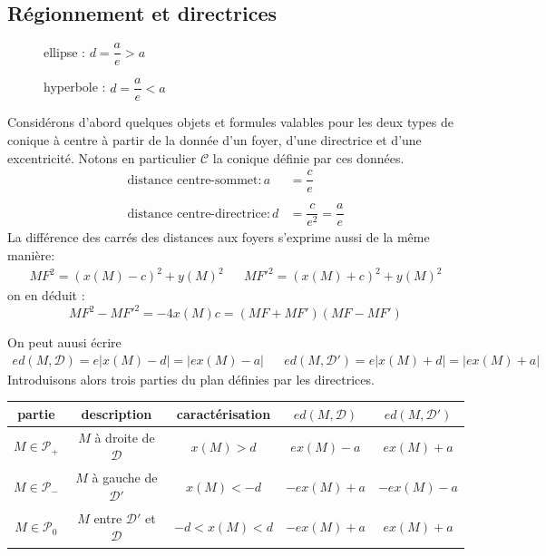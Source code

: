 \subsection{Régionnement et directrices}
\begin{figure}[ht]
  \hfill
  \begin{minipage}{.45\linewidth}
    
    \caption{ellipse : $d=\dfrac{a}{e}>a$}
    \label{fig:C4893_5}
  \end{minipage}
  \hfill
  \begin{minipage}{.45\linewidth}
    
    \caption{hyperbole : $d=\dfrac{a}{e}<a$}
    \label{fig:C4893_6}
  \end{minipage}
  \hfill
\end{figure}
Considérons d'abord quelques objets et formules valables pour les deux types de conique à centre à partir de la donnée d'un foyer, d'une directrice et d'une excentricité. Notons en particulier $\mathcal C$ la conique définie par ces données.
\begin{align*}
 \text{distance centre-sommet} : a &=\dfrac{c}{e}\\ \\
 \text{distance centre-directrice} : d &=\dfrac{c}{e^2}=\dfrac{a}{e}
\end{align*}
La différence des carrés des distances aux foyers s'exprime aussi de la même manière:
\begin{align*}
 MF^2 = (x(M)-c)^2+y(M)^2 & & MF'^2 = (x(M)+c)^2+y(M)^2 
\end{align*}
on en déduit :
\begin{displaymath}
  MF^2 - MF'^2 = -4x(M)c = (MF + MF')(MF - MF')
\end{displaymath}

On peut auusi écrire
\begin{align*}
 ed(M,\mathcal D)= e|x(M)-d| = |ex(M)-a| & &
 ed(M,\mathcal D')= e|x(M)+d| = |ex(M)+a| 
\end{align*}
Introduisons alors trois parties du plan définies par les directrices.
\begin{center}
\renewcommand{\arraystretch}{1.5}
\begin{tabular}{c|c|c|c|c}
partie & description & caractérisation  & $ed(M,\mathcal D)$ & $ed(M,\mathcal D')$ \\ \hline
$M\in \mathcal P_+$ & $M$ à droite de $\mathcal D$ & $x(M)>d$ & $ex(M)-a$ & $ex(M)+a$ \\ \hline
$M\in \mathcal P_-$ & $M$ à gauche de $\mathcal D'$ & $x(M)<-d$ & $-ex(M)+a$ & $-ex(M)-a$ \\ \hline
$M\in \mathcal P_0$ & $M$ entre $\mathcal D'$ et $\mathcal D$& $-d<x(M)<d$ &  $-ex(M)+a$  &  $ex(M)+a$
\end{tabular}
\end{center}
